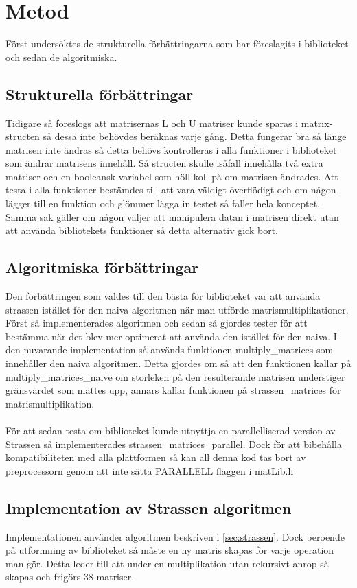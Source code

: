 \section{Metod}
Först undersöktes de strukturella förbättringarna som har föreslagits i biblioteket och sedan de algoritmiska.
\subsection{Strukturella förbättringar}
Tidigare så föreslogs att matrisernas L och U matriser kunde sparas i matrix-structen så dessa inte behövdes beräknas varje gång. Detta fungerar bra så länge matrisen inte ändras så detta behövs kontrolleras i alla funktioner i biblioteket som ändrar matrisens innehåll. Så structen skulle isåfall innehålla två extra matriser och en booleansk variabel som höll koll på om matrisen ändrades. Att testa i alla funktioner bestämdes till att vara väldigt överflödigt och om någon lägger till en funktion och glömmer lägga in testet så faller hela konceptet. Samma sak gäller om någon väljer att manipulera datan i matrisen direkt utan att använda bibliotekets funktioner så detta alternativ gick bort.

\subsection{Algoritmiska förbättringar}
Den förbättringen som valdes till den bästa för biblioteket var att använda strassen istället för den naiva algoritmen när man utförde matrismultiplikationer. Först så implementerades algoritmen och sedan så gjordes tester för att bestämma när det blev mer optimerat att använda den istället för den naiva. I den nuvarande implementation så används funktionen multiply\_matrices som innehåller den naiva algoritmen. Detta gjordes om så att den funktionen kallar på multiply\_matrices\_naive om storleken på den resulterande matrisen understiger gränsvärdet som mättes upp, annars kallar funktionen på strassen\_matrices för matrismultiplikation. 
\\
\\
För att sedan testa om biblioteket kunde utnyttja en parallelliserad version av Strassen så implementerades  strassen\_matrices\_parallel. Dock för att bibehålla kompatibiliteten med alla plattformen så kan all denna kod tas bort av preprocessorn genom att inte sätta PARALLELL flaggen i matLib.h
\subsection{Implementation av Strassen algoritmen}
Implementationen använder algoritmen beskriven i \ref{sec:strassen}. Dock beroende på utformning av biblioteket så måste en ny matris skapas för varje operation man gör. Detta leder till att under en multiplikation utan rekursivt anrop så skapas och frigörs 38 matriser. 

